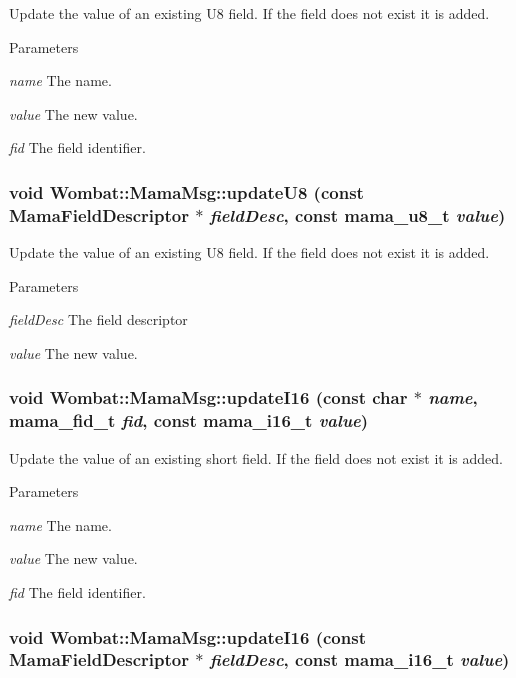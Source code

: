 Update the value of an existing U8 field. If the field does not exist it is added.


\begin{DoxyParams}{Parameters}
\item[{\em name}]The name. \item[{\em value}]The new value. \item[{\em fid}]The field identifier. \end{DoxyParams}
\hypertarget{classWombat_1_1MamaMsg_aea2247f13eccf998889109ff12bda0a9}{
\subsubsection[{updateU8}]{\setlength{\rightskip}{0pt plus 5cm}void Wombat::MamaMsg::updateU8 (const {\bf MamaFieldDescriptor} $\ast$ {\em fieldDesc}, \/  const mama\_\-u8\_\-t {\em value})}}
\label{classWombat_1_1MamaMsg_aea2247f13eccf998889109ff12bda0a9}


Update the value of an existing U8 field. If the field does not exist it is added.


\begin{DoxyParams}{Parameters}
\item[{\em fieldDesc}]The field descriptor \item[{\em value}]The new value. \end{DoxyParams}
\hypertarget{classWombat_1_1MamaMsg_a1be4993c69f8b7b9a022269080b06e70}{
\subsubsection[{updateI16}]{\setlength{\rightskip}{0pt plus 5cm}void Wombat::MamaMsg::updateI16 (const char $\ast$ {\em name}, \/  mama\_\-fid\_\-t {\em fid}, \/  const mama\_\-i16\_\-t {\em value})}}
\label{classWombat_1_1MamaMsg_a1be4993c69f8b7b9a022269080b06e70}


Update the value of an existing short field. If the field does not exist it is added.


\begin{DoxyParams}{Parameters}
\item[{\em name}]The name. \item[{\em value}]The new value. \item[{\em fid}]The field identifier. \end{DoxyParams}
\hypertarget{classWombat_1_1MamaMsg_a559ab92bac1931b49065b1fd00f41694}{
\subsubsection[{updateI16}]{\setlength{\rightskip}{0pt plus 5cm}void Wombat::MamaMsg::updateI16 (const {\bf MamaFieldDescriptor} $\ast$ {\em fieldDesc}, \/  const mama\_\-i16\_\-t {\em value})}}
\label{classWombat_1_1MamaMsg_a559ab92bac1931b49065b1fd00f41694}



